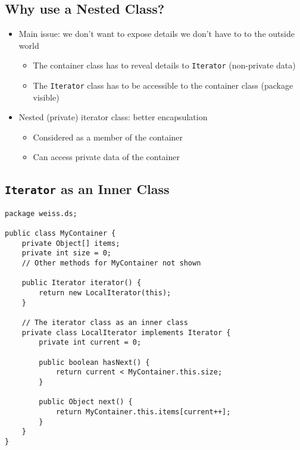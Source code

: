 \documentclass[10pt]{article}
\begin{document}
\subsection*{Why use a Nested Class?}
\begin{itemize}
    \item Main issue: we don't want to expose details we don't have to to the outside world
    \begin{itemize}
        \item The container class has to reveal details to \texttt{Iterator} (non-private data)
        \item The \texttt{Iterator} class has to be accessible to the container class (package visible)
    \end{itemize}
    \item Nested (private) iterator class: better encapsulation
    \begin{itemize}
        \item Considered as a member of the container
        \item Can access private data of the container
    \end{itemize}
\end{itemize}

\subsection*{\texttt{Iterator} as an Inner Class}
\begin{verbatim}
package weiss.ds;

public class MyContainer {
    private Object[] items;
    private int size = 0;
    // Other methods for MyContainer not shown
    
    public Iterator iterator() {
        return new LocalIterator(this);
    }
    
    // The iterator class as an inner class
    private class LocalIterator implements Iterator {
        private int current = 0;
        
        public boolean hasNext() {
            return current < MyContainer.this.size;
        }
    
        public Object next() {
            return MyContainer.this.items[current++];
        }
    }
}
\end{verbatim}
\end{document}
